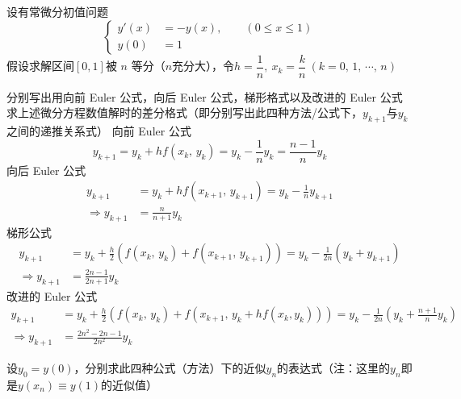 \documentclass[11pt]{article}
\begin{document}
\begin{question}
    \questiontext
    {
        设有常微分初值问题
        \begin{equation*}
            \left\{
            \begin{aligned}
                y'(x) & = - y(x) ,\qquad (0 \leqslant x \leqslant 1) \\
                y(0)  & = 1
            \end{aligned}
            \right.
        \end{equation*}
        假设求解区间$[0, 1]$被 $n$ 等分（$n$充分大），令$h = \dfrac{1}{n},\ x_k = \dfrac{k}{n}\ (k = 0,\, 1,\, \cdots,\, n)$
    }
    \begin{subquestion}{分别写出用向前 Euler 公式，向后 Euler 公式，梯形格式以及改进的 Euler 公式求上述微分方程数值解时的差分格式（即分别写出此四种方法/公式下，$y_{k + 1}$与$y_k$之间的递推关系式）}
        \answer
        {
            向前 Euler 公式
            \begin{equation*}
                y_{k + 1} = y_{k} + hf(x_{k},\, y_{k}) = y_{k} - \frac{1}{n}y_{k} = \frac{n - 1}{n}y_{k}
            \end{equation*}
            向后 Euler 公式
            \begin{align*}
                y_{k + 1}             & = y_{k} + hf(x_{k + 1},\, y_{k + 1}) = y_{k} - \frac{1}{n}y_{k + 1} \\
                \Rightarrow y_{k + 1} & = \frac{n}{n + 1}y_{k}
            \end{align*}
            梯形公式
            \begin{align*}
                y_{k + 1}             & = y_{k} + \frac{h}{2}\left(f(x_{k},\, y_{k}) + f(x_{k + 1},\, y_{k + 1})\right) = y_{k} - \frac{1}{2n}\left(y_{k} + y_{k + 1}\right) \\
                \Rightarrow y_{k + 1} & = \frac{2n - 1}{2n + 1}y_{k}
            \end{align*}
            改进的 Euler 公式
            \begin{align*}
                y_{k + 1}             & = y_{k} + \frac{h}{2}\left(f(x_{k},\, y_{k}) + f(x_{k + 1},\, y_{k} + hf(x_{k}, y_{k}))\right) = y_{k} - \frac{1}{2n}\left(y_{k} + \frac{n + 1}{n}y_{k}\right) \\
                \Rightarrow y_{k + 1} & = \frac{2n^2 - 2n - 1}{2n^2}y_{k}
            \end{align*}
        }
    \end{subquestion}
    \begin{subquestion}{设$y_0 = y(0)$，分别求此四种公式（方法）下的近似$y_n$的表达式（注：这里的$y_n$即是$y(x_n) \equiv y(1)$的近似值）}

\end{subquestion}
\end{question}
\end{document}
